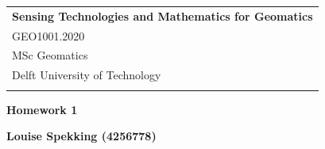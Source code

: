 \documentclass[a4paper,12pt]{article} %
\begin{document}



\thispagestyle{empty} %

\begin{tabular}{p{15.5cm}} %
{\large \bf Sensing Technologies and Mathematics for Geomatics} \\
GEO1001.2020 \\ MSc Geomatics \\ Delft University of Technology \\
\hline %
\\
\end{tabular} %

\vspace*{0.3cm} %

\begin{center} %
	{\Large \bf Homework 1} %
	\vspace{2mm}
	
	{\bf Louise Spekking (4256778)} %
		
\end{center}  

\vspace{0.4cm}


\end{document}
